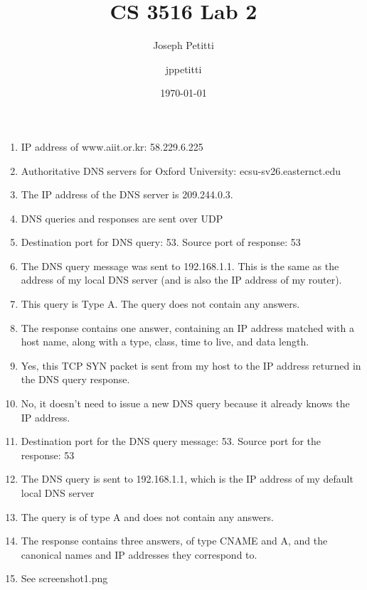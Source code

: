 \documentclass[12pt, letterpaper]{article}
\title{CS 3516 Lab 2}
\author{Joseph Petitti}
\author{jppetitti}
\date{\today}
\begin{document}
\maketitle

\begin{enumerate}
	\item IP address of www.aiit.or.kr: 58.229.6.225
	\item Authoritative DNS servers for Oxford University: ecsu-sv26.easternct.edu
	\item The IP address of the DNS server is 209.244.0.3.
	\item DNS queries and responses are sent over UDP
	\item Destination port for DNS query: 53. Source port of response: 53
	\item The DNS query message was sent to 192.168.1.1. This is the same as the address of my local DNS server (and is also the IP address of my router).
	\item This query is Type A. The query does not contain any answers.
	\item The response contains one answer, containing an IP address matched with a host name, along with a type, class, time to live, and data length.
	\item Yes, this TCP SYN packet is sent from my host to the IP address returned in the DNS query response.
	\item No, it doesn't need to issue a new DNS query because it already knows the IP address.
	\item Destination port for the DNS query message: 53. Source port for the response: 53
	\item The DNS query is sent to 192.168.1.1, which is the IP address of my default local DNS server
	\item The query is of type A and does not contain any answers.
	\item The response contains three answers, of type CNAME and A, and the canonical names and IP addresses they correspond to.
	\item See screenshot1.png


\end{enumerate}
\end{document}
